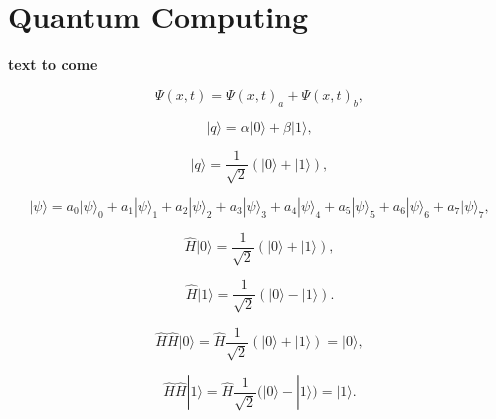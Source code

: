 \documentclass[%
oneside,                 %
final,                   %
10pt]{article}
\begin{document}

\newcommand{\exercisesection}[1]{\subsection*{#1}}



\section{Quantum Computing}

\textbf{text to come}

\begin{equation}
   \Psi(x,t)=\Psi(x,t)_a+\Psi(x,t)_b,
\end{equation}

\begin{equation}
    |q\rangle = \alpha \vert 0 \rangle + \beta |1\rangle,
\end{equation}

\begin{equation}
    |q\rangle = \frac{1}{\sqrt{2}}(\vert 0 \rangle + |1\rangle),
\end{equation}

\begin{equation}
    |\psi\rangle = a_0|\psi\rangle_0+a_1|\psi\rangle_1+a_2|\psi\rangle_2+a_3|\psi\rangle_3+a_4|\psi\rangle_4+a_5|\psi\rangle_5+a_6|\psi\rangle_6+a_7|\psi\rangle_7,
\label{eq:dataord}
\end{equation}

\begin{equation}
    \hat{H}\vert 0 \rangle=
    \frac{1}{\sqrt{2}}(\vert 0 \rangle +|1\rangle),
\end{equation}

\begin{equation}
    \hat{H}|1\rangle=
    \frac{1}{\sqrt{2}}(\vert 0 \rangle -|1\rangle).
\end{equation}

\begin{equation}
    \hat{H}\hat{H}\vert 0 \rangle=
    \hat{H}\frac{1}{\sqrt{2}}(\vert 0 \rangle +|1\rangle)
    =\vert 0 \rangle,
\end{equation}

\begin{equation}
    \hat{H}\hat{H}|1\rangle=
    \hat{H}\frac{1}{\sqrt{2}}(\vert 0 \rangle -|1\rangle)
    =|1\rangle.
\end{equation}
\end{document}
